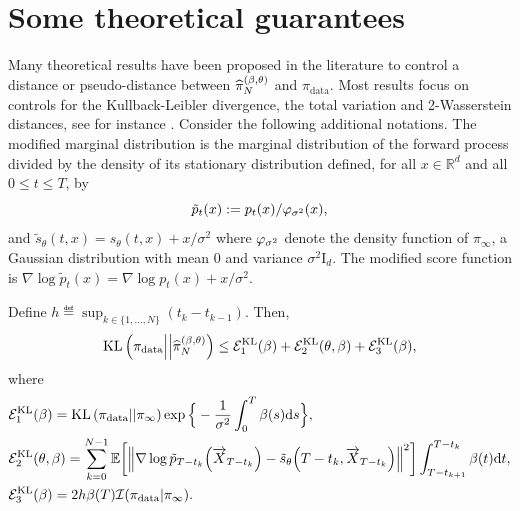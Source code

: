 \documentclass[english,graybox,envcountchap,envcountsame,sectrefs,shortlabels]{svmono}
\theoremstyle{style}
\newcommand{\eqsp}{}
\begin{document}
\section{Some theoretical guarantees}
Many theoretical results have been proposed in the literature to control a distance or pseudo-distance between $\widehat{\pi}_N^{(\beta,\theta)}$ and $\pi_{\mathrm{data}}$. Most results focus on controls for the Kullback-Leibler divergence, the total variation and 2-Wasserstein distances, see for instance \cite{debortoli2021, conforti2023, chen2023sampling}. Consider the following additional notations. The modified marginal distribution is the marginal distribution of the forward process divided by the density of its stationary distribution defined, for all $x\in\mathbb{R}^d$ and all $0\leqslant t \leqslant T$, by
$$
\tilde p_{t}(x) \eqdef {p_t(x)} / {\gausspdf_{\sigma^2}(x)}\eqsp, 
$$
and $ \tilde s_{\theta} (t, x) = s_{\theta}(t, x) + x/\sigma^2$ where $\varphi_{\sigma^2}$ denote the density function of $\pi_\infty$, a Gaussian distribution with mean $0$ and variance $\sigma^2 \mathrm{I}_d$. The modified score function is $\nabla \log \tilde p_t(x)= \nabla \log p_t(x) + x/\sigma^2$.

\begin{theorem}
\label{th:kl:sb}
Define $h \eqdef \sup_{k \in \{1 , \ldots , N \} } (t_{k}-t_{k-1})$. Then,
\begin{equation*}
{\rm KL}\left( \pi_{\rm data} \middle|\middle| \pihat  \right) \leq \mathcal{E}_1^{\rm KL}(\sched) + \mathcal{E}_2^{\rm KL}(\param,\sched) + \mathcal{E}_3^{\rm KL}(\sched)\eqsp,
\end{equation*}
where 
\begin{align*}
    &\mathcal{E}_1^{\rm KL}(\sched) = {\rm KL}\left( \pi_{\rm data} \middle|\middle| \pi_\infty  \right)  \exp\Big\{- \frac{1}{\sigma^2} \int_0^T \sched(s) \rmd s\Big\}\eqsp,\\
    &\mathcal{E}_2^{\rm KL}(\param,\sched) = \sum_{k = 0}^{N-1}  \mathbb{E} \bigg[  \Big\|   \nabla \log \tilde p_{T-t_k}\Big(\overrightarrow X_{T-t_k}\Big)  - \tilde s_{\param}\Big(T-t_k,  \overrightarrow X_{T-t_k}\Big) \Big\|^2 \bigg]
    \int^{T-t_k}_{T-t_{k+1}} \sched (t) \rmd t\eqsp,\\
    &\mathcal{E}_3^{\rm KL}(\sched) = 2 h  \sched (T) \mathcal{I}(\pi_{\rm data} | \pi_{\infty} )\eqsp.
\end{align*}
\end{theorem}
\end{document}
